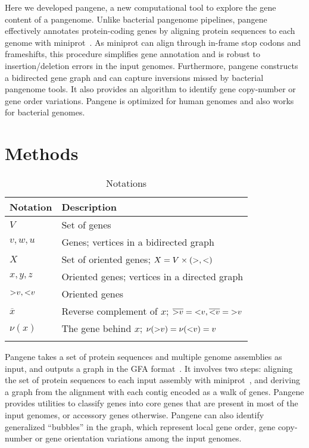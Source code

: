 \documentclass[webpdf,contemporary,large,namedate]{oup-authoring-template}%
\begin{document}
Here we developed pangene, a new computational tool to explore the gene content of a pangenome.
Unlike bacterial pangenome pipelines, pangene effectively annotates protein-coding genes
by aligning protein sequences to each genome with miniprot~\citep{Li:2023ac}.
As miniprot can align through in-frame stop codons and frameshifts,
this procedure simplifies gene annotation and is robust to insertion/deletion errors in the input genomes.
Furthermore, pangene constructs a bidirected gene graph and can capture inversions
missed by bacterial pangenome tools.
It also provides an algorithm to
identify gene copy-number or gene order variations.
Pangene is optimized for human genomes and also works for bacterial genomes.

\section{Methods}

\begin{table}[!tb]
\caption{Notations\label{tab:sym}}
\begin{tabular*}{\columnwidth}{@{\extracolsep\fill}ll@{\extracolsep\fill}}
\toprule
Notation & Description \\
\midrule
$V$ & Set of genes \\
$v,w,u$ & Genes; vertices in a bidirected graph \\
$X$ & Set of oriented genes; $X=V\times({\rm >},{\rm <})$ \\
$x,y,z$ & Oriented genes; vertices in a directed graph \\
${\rm >}v,{\rm <}v$ & Oriented genes \\
$\overline{x}$ & Reverse complement of $x$; $\overline{{\rm >}v}={\rm <}v,\overline{{\rm <}v}={\rm >}v$ \\
$\nu(x)$ & The gene behind $x$; $\nu({\rm >}v)=\nu({\rm <}v)=v$ \\
\botrule
\end{tabular*}
\end{table}

Pangene takes a set of protein sequences and multiple genome assemblies as input,
and outputs a graph in the GFA format~\citep{Li:2020aa}.
It involves two steps: aligning the set of protein sequences to each input assembly with miniprot~\citep{Li:2023ac},
and deriving a graph from the alignment with each contig encoded as a walk of genes.
Pangene provides utilities to classify genes into core genes that are present in most of the input genomes, or accessory genes otherwise.
Pangene can also identify generalized ``bubbles'' in the graph, which represent local gene order,
gene copy-number or gene orientation variations among the input genomes.
\end{document}
